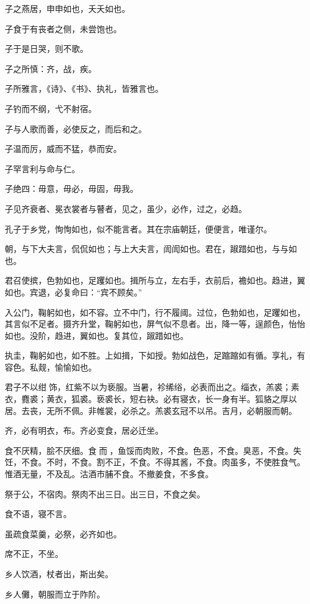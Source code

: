 \documentclass[a5paper]{ctexbook}
\begin{document}
    子之燕居，申申如也，夭夭如也。

    子食于有丧者之侧，未尝饱也。

    子于是日哭，则不歌。

    子之所慎：齐，战，疾。

    子所雅言，《诗》、《书》、执礼，皆雅言也。

    子钓而不纲，弋不射宿。

    子与人歌而善，必使反之，而后和之。

    子温而厉，威而不猛，恭而安。

    子罕言利与命与仁。

    子绝四：毋意，毋必，毋固，毋我。

    子见齐衰者、冕衣裳者与瞽者，见之，虽少，必作，过之，必趋。

    孔子于乡党，恂恂如也，似不能言者。其在宗庙朝廷，便便言，唯谨尔。

    朝，与下大夫言，侃侃如也；与上大夫言，訚訚如也。君在，踧踖如也，与与如也。

    君召使摈，色勃如也，足躩如也。揖所与立，左右手，衣前后，襜如也。趋进，翼如也。宾退，必复命曰：“宾不顾矣。”

    入公门，鞠躬如也，如不容。立不中门，行不履阈。过位，色勃如也，足躩如也，其言似不足者。摄齐升堂，鞠躬如也，屏气似不息者。出，降一等，逞颜色，怡怡如也。没阶，趋进，翼如也。复其位，踧踖如也。

    执圭，鞠躬如也，如不胜。上如揖，下如授。勃如战色，足蹜蹜如有循。享礼，有容色。私觌，愉愉如也。

    君子不以绀𮉪饰，红紫不以为亵服。当暑，袗𫄨绤，必表而出之。缁衣，羔裘；素衣，麑裘；黄衣，狐裘。亵裘长，短右袂。必有寝衣，长一身有半。狐貉之厚以居。去丧，无所不佩。非帷裳，必杀之。羔裘玄冠不以吊。吉月，必朝服而朝。

    齐，必有明衣，布。齐必变食，居必迁坐。

    食不厌精，脍不厌细。食𮩞而𮩝，鱼馁而肉败，不食。色恶，不食。臭恶，不食。失饪，不食。不时，不食。割不正，不食。不得其酱，不食。肉虽多，不使胜食气。惟酒无量，不及乱。沽酒市脯不食。不撤姜食，不多食。

    祭于公，不宿肉。祭肉不出三日。出三日，不食之矣。
    
    食不语，寝不言。
    
    虽疏食菜羹，必祭，必齐如也。

    席不正，不坐。
    
    乡人饮酒，杖者出，斯出矣。
    
    乡人儺，朝服而立于阼阶。
    
\end{document}
